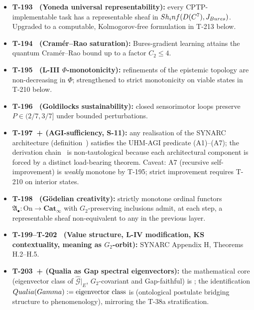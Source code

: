 \begin{itemize}[leftmargin=2em,nosep]
  \item \textbf{T-193~ (Yoneda universal representability):}
        every CPTP-implementable task has a representable sheaf in
        $Sh_inf(D(C^7), J_{Bures})$. Upgraded to a
        computable, Kolmogorov-free formulation in T-213 below.
  \item \textbf{T-194~ (Cram\'er--Rao saturation):}
        Bures-gradient learning attains the quantum Cram\'er--Rao bound
        up to a factor $C_2 \leq 4$.
  \item \textbf{T-195~ (L-III $\Phi$-monotonicity):}
        refinements of the epistemic topology are non-decreasing in
        $\Phi$; strengthened to strict monotonicity on viable states in
        T-210 below.
  \item \textbf{T-196~ (Goldilocks sustainability):}
        closed sensorimotor loops preserve $P \in (2/7, 3/7]$ under
        bounded perturbations.
  \item \textbf{T-197~+ (AGI-sufficiency, S-11):}
        any realisation of the SYNARC architecture (definition~)
        satisfies the UHM-AGI predicate (A1)--(A7); the derivation
        chain~ is non-tautological because each architectural
        component is forced by a distinct load-bearing theorem. Caveat:
        A7 (recursive self-improvement) is \emph{weakly} monotone by
        T-195; strict improvement requires T-210 on interior states.
  \item \textbf{T-198~ (G\"odelian creativity):}
        strictly monotone ordinal functors $\mathfrak{A}_\bullet:
        \mathrm{On} \to \mathbf{Cat}_\infty$ with $G_2$-preserving
        inclusions admit, at each step, a representable sheaf
        non-equivalent to any in the previous layer.
  \item \textbf{T-199--T-202~ (Value structure, L-IV
        modification, KS contextuality, meaning as $G_2$-orbit):}
        SYNARC Appendix H, Theorems H.2--H.5.
  \item \textbf{T-203~+ (Qualia as Gap spectral
        eigenvectors):} the mathematical core (eigenvector class of
        $\hat{\mathcal G}|_E$, $G_2$-covariant and Gap-faithful) is
        ; the identification
        $Qualia(Gamma) := \text{eigenvector class}$ is
         (ontological postulate bridging structure to
        phenomenology), mirroring the T-38a stratification.

\end{itemize}
